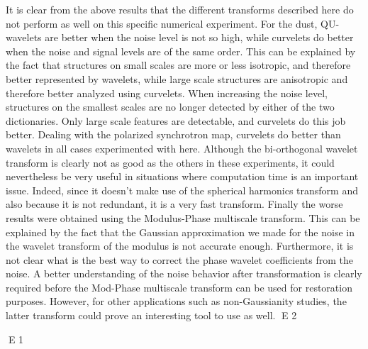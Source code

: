 It is clear from the above results that the different transforms described here do not perform as well 
on this specific numerical experiment. For the dust, QU-wavelets are better when the noise level is 
not so high, while curvelets do better when the noise and signal levels are of the same order. This can be 
explained by the fact that structures on small scales are more or less isotropic, and therefore better 
represented by wavelets, while large scale structures are anisotropic and therefore better analyzed 
using curvelets. When increasing the noise level, structures on the smallest scales are no longer detected 
by either of the two dictionaries. Only large scale features are detectable, and curvelets do this job better. 
Dealing with the polarized synchrotron map, curvelets do better than wavelets in all cases experimented with here. 
Although the bi-orthogonal wavelet transform is clearly not as good as the others in these experiments, 
it could nevertheless be very useful in situations where computation time is an important issue. Indeed, since it 
doesn't make use of the spherical harmonics transform and also because it is not redundant, it is a very fast transform.
Finally the worse results were obtained using the Modulus-Phase multiscale transform. This can be explained 
by the fact that the Gaussian approximation we made for the noise in the wavelet transform of the modulus 
is not accurate enough. Furthermore, it is not clear what is the best way to correct the phase wavelet 
coefficients from the noise. A better understanding of the noise behavior after transformation is clearly 
required before the Mod-Phase multiscale transform can be used for restoration purposes. However, for other 
applications such as non-Gaussianity studies, the latter transform could prove an interesting tool to use as well.
E 2








E 1
